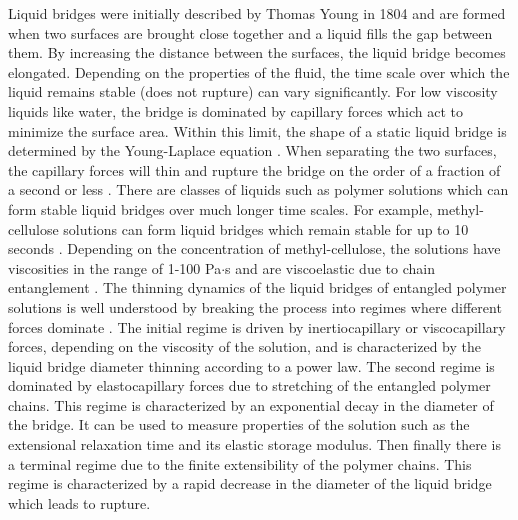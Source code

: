 \documentclass[lineno]{JFM-FLM_Au}
\begin{document}
Liquid bridges were initially described by Thomas Young in 1804 \cite{thomas_iii_1804} and are formed when two surfaces are brought close together and a liquid fills the gap between them. By increasing the distance between the surfaces, the liquid bridge becomes elongated. Depending on the properties of the fluid, the time scale over which the liquid remains stable (does not rupture) can vary significantly. For low viscosity liquids like water, the bridge is dominated by capillary forces which act to minimize the surface area. Within this limit, the shape of a static liquid bridge is determined by the Young-Laplace equation \cite{meseguer_review_1995}. When separating the two surfaces, the capillary forces will thin and rupture the bridge on the order of a fraction of a second or less \cite{coriell_stability_1977}. There are classes of liquids such as polymer solutions which can form stable liquid bridges over much longer time scales. For example, methyl-cellulose solutions can form liquid bridges which remain stable for up to 10 seconds \cite{morozova_extensional_2018}. Depending on the concentration of methyl-cellulose, the solutions have viscosities in the range of 1-100 Pa$\cdot$s and are viscoelastic due to chain entanglement \cite{morozova_extensional_2018}. The thinning dynamics of the liquid bridges of entangled polymer solutions is well understood by breaking the process into regimes where different forces dominate \cite{dinic_macromolecular_2019}. The initial regime is driven by inertiocapillary or viscocapillary forces, depending on the viscosity of the solution, and is characterized by the liquid bridge diameter thinning according to a power law. The second regime is dominated by elastocapillary forces due to stretching of the entangled polymer chains. This regime is characterized by an exponential decay in the diameter of the bridge. It can be used to measure properties of the solution such as the extensional relaxation time and its elastic storage modulus. Then finally there is a terminal regime due to the finite extensibility of the polymer chains. This regime is characterized by a rapid decrease in the diameter of the liquid bridge which leads to rupture.
\end{document}
